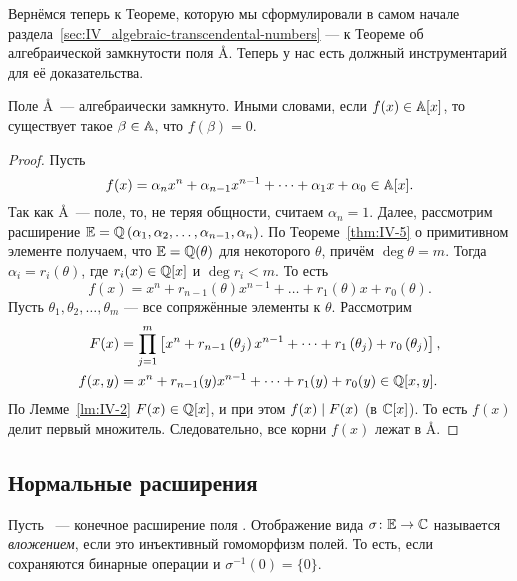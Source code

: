 Вернёмся теперь к Теореме, которую мы сформулировали в самом начале раздела~\ref{sec:IV_algebraic-transcendental-numbers} --- к Теореме об алгебраической замкнутости поля \AA. Теперь у нас есть должный инструментарий для её доказательства.

\begin{ntheorem}
\label{thm:IV-6}
    Поле \AA~--- алгебраически замкнуто. Иными словами, если $f(x) \in \AA[x]$, то существует такое $\beta \in \AA$, что $f(\beta) = 0$.
\end{ntheorem}
\begin{proof}
    Пусть
    \[
        f(x) = \alpha_nx^n + \alpha_{n-1}x^{n-1} + \dots + \alpha_1x + \alpha_0 \in \AA[x].
    \]
    Так как \AA~--- поле, то, не теряя общности, считаем $\alpha_n = 1$. Далее, рассмотрим расширение $\EE = \QQ\left( \alpha_1, \alpha_2, \dots, \alpha_{n-1}, \alpha_n \right)$. По Теореме~\ref{thm:IV-5} о примитивном элементе получаем, что $\EE = \QQ(\theta)$ для некоторого $\theta$, причём $\deg{\theta} = m$. Тогда $\alpha_i = r_i(\theta)$, где $r_i(x) \in \QQ[x]$ и $\deg{r_i} < m$. То есть
    \[
        f(x) = x^n + r_{n-1}(\theta) x^{n-1} + \dots + r_1(\theta)x + r_0(\theta).
    \]
    Пусть $\theta_1, \theta_2, \dots, \theta_m$ --- все сопряжённые элементы к $\theta$. Рассмотрим
    \begin{align*}
        F(x) &= \prod_{j=1}^m \left[ x^n + r_{n-1}\left(\theta_j\right)x^{n-1} + \dots + r_1\left(\theta_j\right) + r_0\left(\theta_j\right) \right], \\
        f(x,y) &= x^n + r_{n-1}(y)x^{n-1} + \dots + r_1(y) + r_0(y) \in \QQ[x,y].
    \end{align*}
    По Лемме~\ref{lm:IV-2} $F(x) \in \QQ[x]$, и при этом $f(x) \divides F(x)$ (в $\CC[x]$). То есть $f(x)$ делит первый множитель. Следовательно, все корни $f(x)$ лежат в \AA.
\end{proof}


\subsection{Нормальные расширения}
\label{subsec:IV-4}

\begin{ndefinition}
\label{def:IV_embedding}
    Пусть \EE~--- конечное расширение поля \QQ. Отображение вида $\sigma\colon \EE \to \CC$ называется \emph{вложением}, если это инъективный гомоморфизм полей. То есть, если сохраняются бинарные операции и $\sigma^{-1}(0) = \{ 0 \}$.
\end{ndefinition}

